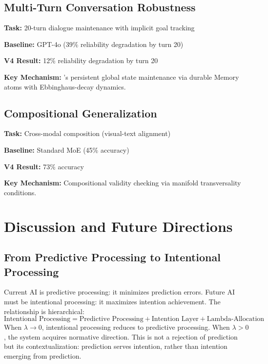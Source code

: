 \documentclass[11pt,a4paper]{article}
\theoremstyle{definition}
\theoremstyle{remark}
\newcommand{\CAA}{\text{CAA-X}}
\newcommand{\GWP}{\text{GWP}}
\begin{document}
\subsection{Multi-Turn Conversation Robustness}\label{subsec:conversation}

\textbf{Task:} 20-turn dialogue maintenance with implicit goal tracking

\textbf{Baseline:} GPT-4o (39\% reliability degradation by turn 20)

\textbf{\CAA{} V4 Result:} 12\% reliability degradation by turn 20

\textbf{Key Mechanism:} \GWP{}'s persistent global state maintenance via durable Memory atoms with Ebbinghaus-decay dynamics.

\subsection{Compositional Generalization}\label{subsec:compositional-gen}

\textbf{Task:} Cross-modal composition (visual-text alignment)

\textbf{Baseline:} Standard MoE (45\% accuracy)

\textbf{\CAA{} V4 Result:} 73\% accuracy

\textbf{Key Mechanism:} Compositional validity checking via manifold transversality conditions.

\section{Discussion and Future Directions}\label{sec:discussion}

\subsection{From Predictive Processing to Intentional Processing}\label{subsec:intentional-processing}

Current AI is predictive processing: it minimizes prediction errors. Future AI must be intentional processing: it maximizes intention achievement. The relationship is hierarchical:
\begin{equation}
\text{Intentional Processing} = \text{Predictive Processing} + \text{Intention Layer} + \text{Lambda-Allocation}
\end{equation}
When $\lambda \rightarrow 0$, intentional processing reduces to predictive processing. When $\lambda > 0$, the system acquires normative direction. This is not a rejection of prediction but its contextualization: prediction serves intention, rather than intention emerging from prediction.
\end{document}
